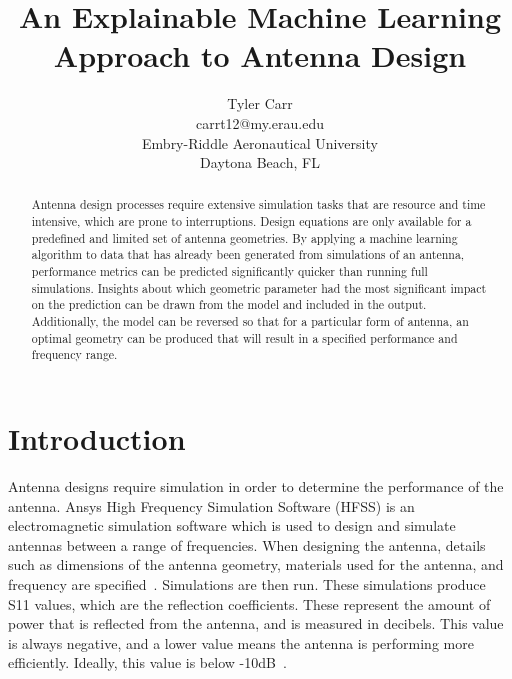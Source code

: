 \documentclass[lettersize,journal]{IEEEtran}
\begin{document}
\title{An Explainable Machine Learning Approach to Antenna Design}

\author{Tyler Carr \\ carrt12@my.erau.edu \\ Embry-Riddle Aeronautical University \\ Daytona Beach, FL}

\maketitle

\begin{abstract}
Antenna design processes require extensive simulation tasks that are resource and time intensive, which are prone to interruptions. Design equations are only available for a predefined and limited set of antenna geometries. By applying a machine learning algorithm to data that has already been generated from simulations of an antenna, performance metrics can be predicted significantly quicker than running full simulations. Insights about which geometric parameter had the most significant impact on the prediction can be drawn from the model and included in the output. Additionally, the model can be reversed so that for a particular form of antenna, an optimal geometry can be produced that will result in a specified performance and frequency range. 
\end{abstract}

\section{Introduction}
Antenna designs require simulation in order to determine the performance of the antenna. Ansys High Frequency Simulation Software (HFSS) is an electromagnetic simulation software which is used to design and simulate antennas between a range of frequencies. When designing the antenna, details such as dimensions of the antenna geometry, materials used for the antenna, and frequency are specified~\cite{Maxworth_2022}. Simulations are then run. These simulations produce S11 values, which are the reflection coefficients. These represent the amount of power that is reflected from the antenna, and is measured in decibels. This value is always negative, and a lower value means the antenna is performing more efficiently. Ideally, this value is below -10dB~\cite{Bevelacqua_2015}.
\end{document}

